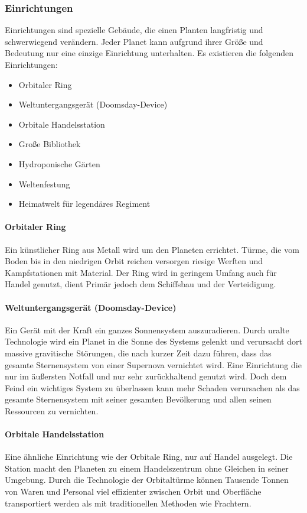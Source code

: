 \documentclass[11pt, a4paper]{article}
\begin{document}
\subsubsection{Einrichtungen}
Einrichtungen sind spezielle Gebäude, die einen Planten langfristig und schwerwiegend verändern.
Jeder Planet kann aufgrund ihrer Größe und Bedeutung nur eine einzige Einrichtung unterhalten.
Es existieren die folgenden Einrichtungen:
\begin{itemize}
    \item Orbitaler Ring
    \item Weltuntergangsgerät (Doomsday-Device)
    \item Orbitale Handelsstation
    \item Große Bibliothek
    \item Hydroponische Gärten
    \item Weltenfestung
    \item Heimatwelt für legendäres Regiment
\end{itemize}
%
\paragraph{Orbitaler Ring}
Ein künstlicher Ring aus Metall wird um den Planeten errichtet. Türme, die vom Boden bis in den niedrigen
Orbit reichen versorgen riesige Werften und Kampfstationen mit Material. Der Ring wird in geringem Umfang auch
für Handel genutzt, dient Primär jedoch dem Schiffsbau und der Verteidigung.
%
\paragraph{Weltuntergangsgerät (Doomsday-Device)}
Ein Gerät mit der Kraft ein ganzes Sonnensystem auszuradieren. Durch uralte Technologie wird ein Planet in die
Sonne des Systems gelenkt und verursacht dort massive gravitische Störungen, die nach kurzer Zeit dazu führen,
dass das gesamte Sternensystem von einer Supernova vernichtet wird. Eine Einrichtung die nur im äußersten Notfall
und nur sehr zurückhaltend genutzt wird. Doch dem Feind ein wichtiges System zu überlassen kann mehr Schaden
verursachen als das gesamte Sternensystem mit seiner gesamten Bevölkerung und allen seinen Ressourcen zu
vernichten.
%
\paragraph{Orbitale Handelsstation}
Eine ähnliche Einrichtung wie der Orbitale Ring, nur auf Handel ausgelegt. Die Station macht den Planeten
zu einem Handelszentrum ohne Gleichen in seiner Umgebung. Durch die Technologie der Orbitaltürme können
Tausende Tonnen von Waren und Personal viel effizienter zwischen Orbit und Oberfläche transportiert werden
als mit traditionellen Methoden wie Frachtern.
%
\end{document}
